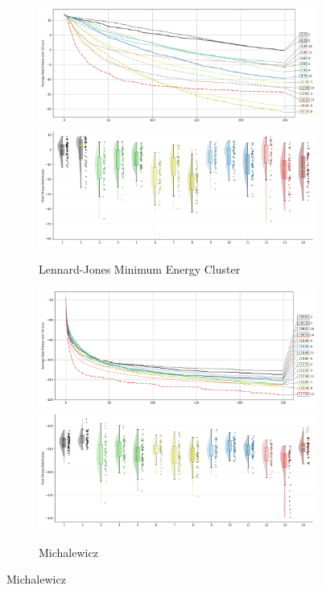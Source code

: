 \begin{figure}[p]\ContinuedFloat
\renewcommand\thesubfigure{C.\arabic{figure}.\arabic{subfigure}} %

    \centering

\begin{subfigure}{1\textwidth}
    \centering
    \includegraphics[width=.49\textwidth]{Figures/results/500/Lennard_Jones_Minimum_Energy_Cluster_All_selected_algorithms_dim500_annot_legend.png}
    \includegraphics[width=.49\textwidth]{Figures/results/500/Lennard_Jones_Minimum_Energy_Cluster_all_dim500_raincloud_vertical.png}
    \caption{Lennard-Jones Minimum Energy Cluster}
\end{subfigure}

\begin{subfigure}{1\textwidth}
    \centering
    \includegraphics[width=.49\textwidth]{Figures/results/500/Michalewicz_All_selected_algorithms_dim500_annot_legend.png}
    \includegraphics[width=.49\textwidth]{Figures/results/500/Michalewicz_all_dim500_raincloud_vertical.png}
    \caption{Michalewicz}
\end{subfigure}


\end{figure}
